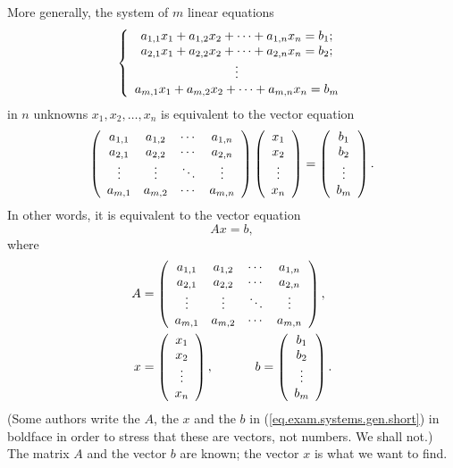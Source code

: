 \documentclass[numbers=enddot,12pt,final,onecolumn,notitlepage]{scrartcl}%
\theoremstyle{definition}
\begin{document}
More generally, the system of $m$ linear equations
\[
\left\{
\begin{array}
[c]{c}%
a_{1,1}x_{1}+a_{1,2}x_{2}+\cdots+a_{1,n}x_{n}=b_{1};\\
a_{2,1}x_{1}+a_{2,2}x_{2}+\cdots+a_{2,n}x_{n}=b_{2};\\
\vdots\\
a_{m,1}x_{1}+a_{m,2}x_{2}+\cdots+a_{m,n}x_{n}=b_{m}%
\end{array}
\right.
\]
in $n$ unknowns $x_{1},x_{2},\ldots,x_{n}$ is equivalent to the vector
equation%
\begin{equation}
\left(
\begin{array}
[c]{cccc}%
a_{1,1} & a_{1,2} & \cdots & a_{1,n}\\
a_{2,1} & a_{2,2} & \cdots & a_{2,n}\\
\vdots & \vdots & \ddots & \vdots\\
a_{m,1} & a_{m,2} & \cdots & a_{m,n}%
\end{array}
\right)  \left(
\begin{array}
[c]{c}%
x_{1}\\
x_{2}\\
\vdots\\
x_{n}%
\end{array}
\right)  =\left(
\begin{array}
[c]{c}%
b_{1}\\
b_{2}\\
\vdots\\
b_{m}%
\end{array}
\right)  . \label{eq.exam.systems.gen}%
\end{equation}
In other words, it is equivalent to the vector equation%
\begin{equation}
Ax=b, \label{eq.exam.systems.gen.short}%
\end{equation}
where%
\begin{align*}
A  &  =\left(
\begin{array}
[c]{cccc}%
a_{1,1} & a_{1,2} & \cdots & a_{1,n}\\
a_{2,1} & a_{2,2} & \cdots & a_{2,n}\\
\vdots & \vdots & \ddots & \vdots\\
a_{m,1} & a_{m,2} & \cdots & a_{m,n}%
\end{array}
\right)  ,\\
x  &  =\left(
\begin{array}
[c]{c}%
x_{1}\\
x_{2}\\
\vdots\\
x_{n}%
\end{array}
\right)  ,\ \ \ \ \ \ \ \ \ \ b=\left(
\begin{array}
[c]{c}%
b_{1}\\
b_{2}\\
\vdots\\
b_{m}%
\end{array}
\right)  .
\end{align*}
(Some authors write the $A$, the $x$ and the $b$ in
(\ref{eq.exam.systems.gen.short}) in boldface in order to stress that these
are vectors, not numbers. We shall not.) The matrix $A$ and the vector $b$ are
known; the vector $x$ is what we want to find.
\end{document}
